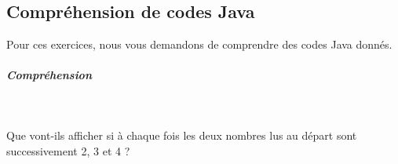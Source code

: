 \documentclass[11pt,a4paper]{article}
\begin{document}
            \par
        \subsection{Compr\'ehension de codes Java}
          Pour ces exercices, nous vous demandons de comprendre des codes Java donn\'es. 
          
			
		\subparagraph{Compr\'ehension} 
		
                \textcolor{white}{.} \par
            
							  Que vont-ils afficher si \`a chaque fois les deux nombres lus au d\'epart sont successivement 2, 3 et 4 ?
							
					\begin{itemize}
				

\end{itemize}
\end{document}
